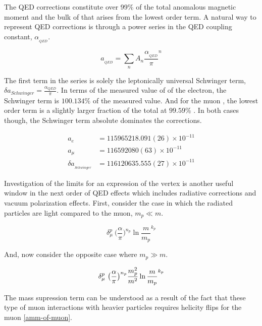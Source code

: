 The QED corrections constitute over 99\% of the total anomalous magnetic moment and the bulk of that arises from the lowest order term.  A natural way to represent QED corrections is through a power series in the QED coupling constant, $\alpha_{_{QED}}$.

\begin{equation}
\label{eqn:qed-correction-series}
a_{_{QED}} = \sum_n{A_n\frac{\alpha_{_{QED}}}{\pi}^n}
\end{equation}

\noindent
The first term in the series is solely the leptonically universal Schwinger term, $\delta a_{Schwinger} = \frac{\alpha_{QED}}{\pi}$.  In terms of the measured value of \gmtwo of the electron, the Schwinger term is $100.134\%$ of the measured value. And for the muon \gmtwo, the lowest order term is a slightly larger fraction of the total at $99.59\%$ \cite{codata}.  In both cases though, the Schwinger term absolute dominates the corrections.

\begin{align*}
a_{e}   & = 115 965 218.091(26) \times 10^{-11} \\
a_{\mu} & = 116 592 080(63) \times 10^{-11} \\
\delta a_{_{Schwinger}} & = 116 120 635.555(27) \times 10^{-11}
\end{align*}

Investigation of the limits for an expression of the vertex is another useful window in the next order of QED effects which includes radiative corrections and vacuum polarization effects.  First, consider the case in which the radiated particles are light compared to the muon, $m_p \ll m$.

\begin{equation}
\label{eqn:qed-2nd-order-small-m}
\delta_\mu^p ~ \big(\frac{\alpha}{\pi} \big)^{n_p} \ln{\frac{m}{m_p}^{k_p}}
\end{equation}

\noindent
And, now consider the opposite case where $m_p \gg m$.

\begin{equation}
\label{eqn:qed-2nd-order-large-m}
\delta_\mu^p ~ \big(\frac{\alpha}{\pi} \big)^{n_p} \\
\frac{m_p^2}{m^2} \ln{\frac{m}{m_p}^{k_p}}
\end{equation}

\noindent
The mass supression term can be understood as a result of the fact that these type of muon interactions with heavier particles requires helicity flips for the muon \ref{amm-of-muon}.

